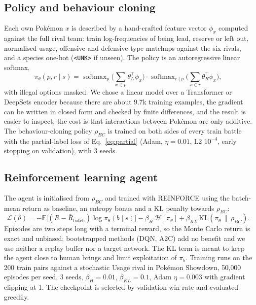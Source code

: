\subsection{Policy and behaviour cloning}
Each own Pokémon $x$ is described by a hand-crafted feature vector $\phi_x$ computed against the full rival team:
train log-frequencies of being lead, reserve or left out, normalised usage, offensive and defensive type matchups
against the six rivals, and a species one-hot (\texttt{<UNK>} if unseen). The policy is an autoregressive linear softmax,
\begin{equation}
\pi_\theta(p,r\mid s)=\operatorname{softmax}_p\Big(\sum_{x\in p}\theta_L^\top\phi_x\Big)\cdot
\operatorname{softmax}_{r\mid p}\Big(\sum_{x\in r}\theta_R^\top\phi_x\Big),
\end{equation}
with illegal options masked. We chose a linear model over a Transformer or DeepSets encoder because there are
about 9.7k training examples, the gradient can be written in closed form and checked by finite differences,
and the result is easier to inspect; the cost is that interactions between Pokémon are only additive.
The behaviour-cloning policy $\rho_{BC}$ is trained on both sides of every train battle with the partial-label loss
of Eq.~\eqref{eq:partial} (Adam, $\eta=0.01$, L2 $10^{-4}$, early stopping on validation), with 3 seeds.

\subsection{Reinforcement learning agent}
The agent is initialised from $\rho_{BC}$ and trained with REINFORCE using the batch-mean return as baseline,
an entropy bonus and a KL penalty towards $\rho_{BC}$:
\begin{equation}
\mathcal L(\theta)=-\mathbb E\big[(R-\bar R_{\text{batch}})\log\pi_\theta(b\mid s)\big]
-\beta_H\,\mathcal H[\pi_\theta]+\beta_{KL}\,\mathrm{KL}(\pi_\theta\,\|\,\rho_{BC}).
\end{equation}
Episodes are two steps long with a terminal reward, so the Monte Carlo return is exact and unbiased; bootstrapped
methods (DQN, A2C) add no benefit and we use neither a replay buffer nor a target network.
The KL term is meant to keep the agent close to human brings and limit exploitation of $\pi_b$.
Training runs on the 200 train pairs against a stochastic Usage rival in Pokémon Showdown,
50{,}000 episodes per seed, 3 seeds, $\beta_H=0.01$, $\beta_{KL}=0.1$, Adam $\eta=0.003$ with gradient clipping at 1.
The checkpoint is selected by validation win rate and evaluated greedily.

